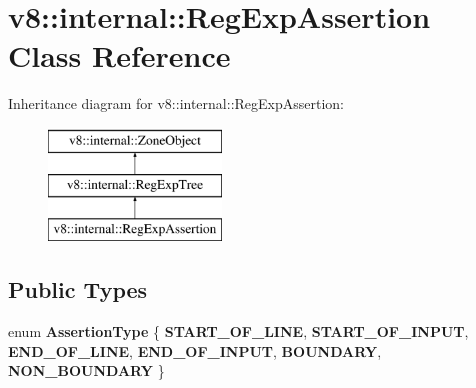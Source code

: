 \hypertarget{classv8_1_1internal_1_1RegExpAssertion}{}\section{v8\+:\+:internal\+:\+:Reg\+Exp\+Assertion Class Reference}
\label{classv8_1_1internal_1_1RegExpAssertion}
Inheritance diagram for v8\+:\+:internal\+:\+:Reg\+Exp\+Assertion\+:\begin{figure}[H]
\begin{center}
\leavevmode
\includegraphics[height=3.000000cm]{classv8_1_1internal_1_1RegExpAssertion}
\end{center}
\end{figure}
\subsection*{Public Types}
\begin{DoxyCompactItemize}
\item 
\mbox{\label{classv8_1_1internal_1_1RegExpAssertion_a726548397a09020b1228fdfa4f410c29}} 
enum {\bfseries Assertion\+Type} \{ \newline
{\bfseries S\+T\+A\+R\+T\+\_\+\+O\+F\+\_\+\+L\+I\+NE}, 
{\bfseries S\+T\+A\+R\+T\+\_\+\+O\+F\+\_\+\+I\+N\+P\+UT}, 
{\bfseries E\+N\+D\+\_\+\+O\+F\+\_\+\+L\+I\+NE}, 
{\bfseries E\+N\+D\+\_\+\+O\+F\+\_\+\+I\+N\+P\+UT}, 
\newline
{\bfseries B\+O\+U\+N\+D\+A\+RY}, 
{\bfseries N\+O\+N\+\_\+\+B\+O\+U\+N\+D\+A\+RY}
 \}
\end{DoxyCompactItemize}

